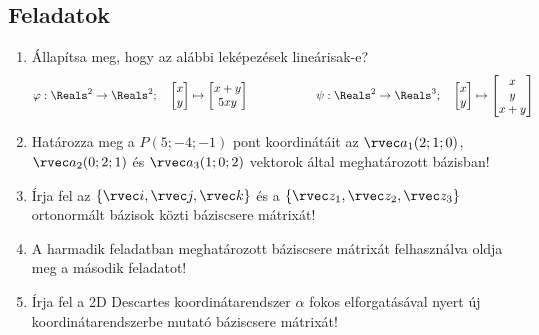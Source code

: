 \documentclass[a4paper, 12pt]{scrartcl}
\begin{document}
\subsection{Feladatok}
\begin{enumerate}
  \item Állapítsa meg, hogy az alábbi leképezések lineárisak-e?
        $$
          \varphi: \Reals^2 \to \Reals^2;
          \quad
          \begin{bmatrix}
            x \\
            y
          \end{bmatrix} \mapsto \begin{bmatrix}
            x+y \\
            5xy
          \end{bmatrix}
          \hspace{2cm}
          \psi: \Reals^2 \to \Reals^3;
          \quad
          \begin{bmatrix}
            x \\
            y
          \end{bmatrix} \mapsto \begin{bmatrix}
            x \\
            y \\
            x+y
          \end{bmatrix}
        $$

  \item Határozza meg a $P(5; -4; -1)$ pont koordinátáit az $\rvec a_1(2; 1;0)$,
        $\rvec a_2(0; 2; 1)$ és $\rvec a_3(1; 0; 2)$ vektorok által
        meghatározott bázisban!

  \item Írja fel az $\{ \rvec i, \rvec j, \rvec k \}$ és a $\{ \rvec z_1,
          \rvec z_2, \rvec z_3\}$ ortonormált bázisok közti báziscsere mátrixát!

  \item A harmadik feladatban meghatározott báziscsere mátrixát felhasználva
        oldja meg a második feladatot!

  \item Írja fel a 2D Descartes koordinátarendszer $\alpha$ fokos elforgatásával
        nyert új koordinátarendszerbe mutató báziscsere mátrixát!


\end{enumerate}
\end{document}
